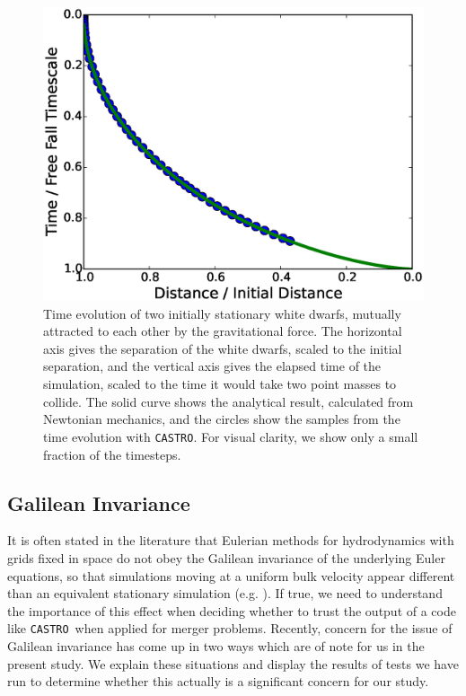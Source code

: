 \documentclass[iop,numberedappendix]{../emulateapj}
\newcommand{\castro}{\texttt{CASTRO}}
\begin{document}
\begin{figure}
  \centering
  \includegraphics[scale=0.45]{plots/freefall}
  \caption{Time evolution of two initially stationary white dwarfs,
    mutually attracted to each other by the gravitational force. The
    horizontal axis gives the separation of the white dwarfs, scaled
    to the initial separation, and the vertical axis gives the elapsed
    time of the simulation, scaled to the time it would take two point masses
    to collide. The solid curve shows the analytical result,
    calculated from Newtonian mechanics, and the circles show the
    samples from the time evolution with \castro. For visual clarity, we 
    show only a small fraction of the timesteps.}
  \label{fig:freefall}
\end{figure}

\subsection{Galilean Invariance}\label{sec:galileo}

It is often stated in the literature that Eulerian methods for
hydrodynamics with grids fixed in space do not obey the Galilean
invariance of the underlying Euler equations, so that simulations
moving at a uniform bulk velocity appear different than an
equivalent stationary simulation (e.g. \cite{arepo}). If true, we need to understand 
the importance of this effect when deciding whether to trust the 
output of a code like \castro\ when applied for merger problems.
Recently, concern for the issue of Galilean invariance has come up in two ways which are of note for us 
in the present study. We explain these situations and display 
the results of tests we have run to determine whether this 
actually is a significant concern for our study.
\end{document}
